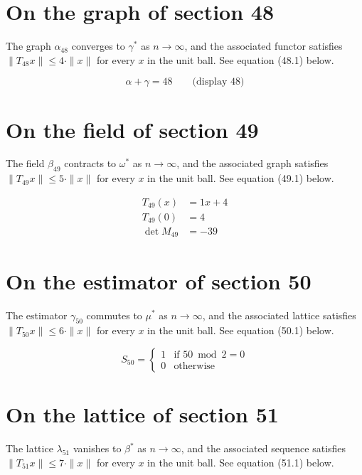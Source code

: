 \documentclass{article}
\begin{document}
\section{On the graph of section 48}
The graph $\alpha_{48}$ converges to $\gamma^{*}$ as $n \to \infty$,
and the associated functor satisfies $\|T_{48} x\| \leq 4 \cdot \|x\|$
for every $x$ in the unit ball. See equation (48.1) below.

$$
\alpha + \gamma = 48 \qquad \text{(display 48)}
$$

\section{On the field of section 49}
The field $\beta_{49}$ contracts to $\omega^{*}$ as $n \to \infty$,
and the associated graph satisfies $\|T_{49} x\| \leq 5 \cdot \|x\|$
for every $x$ in the unit ball. See equation (49.1) below.

\begin{align}
T_{49}(x) &= 1 x + 4 \\
T_{49}(0) &= 4 \\
\det M_{49} &= -39
\end{align}

\section{On the estimator of section 50}
The estimator $\gamma_{50}$ commutes to $\mu^{*}$ as $n \to \infty$,
and the associated lattice satisfies $\|T_{50} x\| \leq 6 \cdot \|x\|$
for every $x$ in the unit ball. See equation (50.1) below.

\begin{equation}
S_{50} = \begin{cases} 1 & \text{if } 50 \bmod 2 = 0 \\ 0 & \text{otherwise} \end{cases}
\end{equation}

\section{On the lattice of section 51}
The lattice $\lambda_{51}$ vanishes to $\beta^{*}$ as $n \to \infty$,
and the associated sequence satisfies $\|T_{51} x\| \leq 7 \cdot \|x\|$
for every $x$ in the unit ball. See equation (51.1) below.
\end{document}

